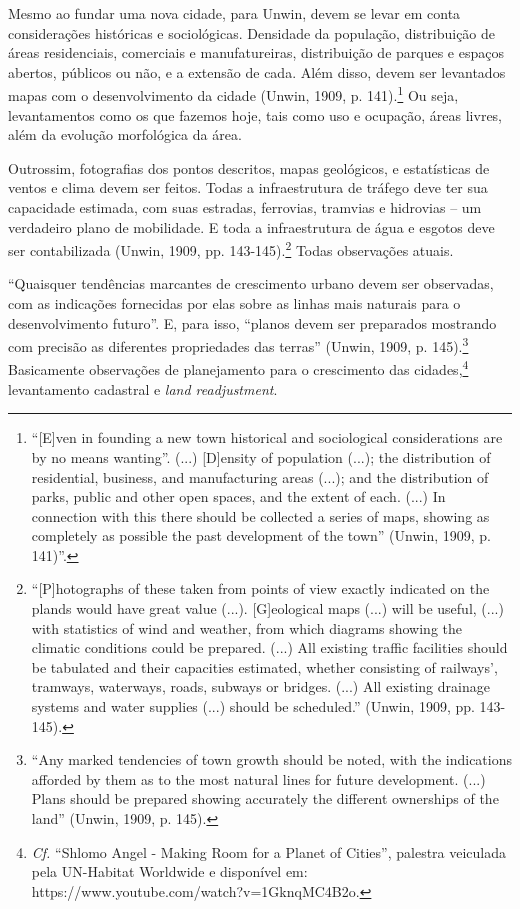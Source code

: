\documentclass[12pt, a4paper]{book} %
\begin{document}
        Mesmo ao fundar uma nova cidade, para Unwin, devem se levar em conta considerações históricas e sociológicas. Densidade da população, distribuição de áreas residenciais, comerciais e manufatureiras, distribuição de parques e espaços abertos, públicos ou não, e a extensão de cada. Além disso, devem ser levantados mapas com o desenvolvimento da cidade (Unwin, 1909, p. 141).\footnote[29]{``[E]ven in founding a new town historical and sociological considerations are by no means wanting''. (...) [D]ensity of population (...); the distribution of residential, business, and manufacturing areas (...); and the distribution of parks, public and other open spaces, and the extent of each. (...) In connection with this there should be collected a series of maps, showing as completely as possible the past development of the town'' (Unwin, 1909, p. 141)''.} Ou seja, levantamentos como os que fazemos hoje, tais como uso e ocupação, áreas livres, além da evolução morfológica da área.

        Outrossim, fotografias dos pontos descritos, mapas geológicos, e estatísticas de ventos e clima devem ser feitos. Todas a infraestrutura de tráfego deve ter sua capacidade estimada, com suas estradas, ferrovias, tramvias e hidrovias – um verdadeiro plano de mobilidade. E toda a infraestrutura de água e esgotos deve ser contabilizada (Unwin, 1909, pp. 143-145).\footnote[30]{``[P]hotographs of these taken from points of view exactly indicated on the plands would have great value (...). [G]eological maps (...) will be useful, (...) with statistics of wind and weather, from which diagrams showing the climatic conditions could be prepared. (...) All existing traffic facilities should be tabulated and their capacities estimated, whether consisting of railways', tramways, waterways, roads, subways or bridges. (...) All existing drainage systems and water supplies (...) should be scheduled.'' (Unwin, 1909, pp. 143-145).} Todas observações atuais.

        ``Quaisquer tendências marcantes de crescimento urbano devem ser observadas, com as indicações fornecidas por elas sobre as linhas mais naturais para o desenvolvimento futuro''. E, para isso, ``planos devem ser preparados mostrando com precisão as diferentes propriedades das terras'' (Unwin, 1909, p. 145).\footnote[31]{``Any marked tendencies of town growth should be noted, with the indications afforded by them as to the most natural lines for future development. (...) Plans should be prepared showing accurately the different ownerships of the land'' (Unwin, 1909, p. 145).} Basicamente observações de planejamento para o crescimento das cidades,\footnote[32]{\textit{Cf.} ``Shlomo Angel - Making Room for a Planet of Cities'', palestra veiculada pela UN-Habitat Worldwide e disponível em: https://www.youtube.com/watch?v=1GknqMC4B2o.} levantamento cadastral e \textit{land readjustment}.
\end{document}
